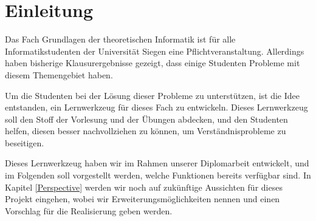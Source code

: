 



\chapter{Einleitung}\label{Introduction}

Das Fach Grundlagen der theoretischen Informatik ist für alle
Informatikstudenten der Universität Siegen eine Pflichtveranstaltung. Allerdings
haben bisherige Klausurergebnisse gezeigt, dass einige Studenten Probleme mit
diesem Themengebiet haben.\vspace{10pt}

Um die Studenten bei der Lösung dieser Probleme zu unterstützen, ist die Idee
entstanden, ein Lernwerkzeug für dieses Fach zu entwickeln. Dieses Lernwerkzeug
soll den Stoff der Vorlesung und der Übungen abdecken, und den Studenten helfen,
diesen besser nachvollziehen zu können, um Verständnisprobleme zu
beseitigen.\vspace{10pt}

Dieses Lernwerkzeug haben wir im Rahmen unserer Diplomarbeit entwickelt, und im
Folgenden soll vorgestellt werden, welche Funktionen bereits verfügbar sind. In
Kapitel \ref{Perspective} werden wir noch auf zukünftige Aussichten für dieses
Projekt eingehen, wobei wir Erweiterungsmöglichkeiten nennen und einen Vorschlag
für die Realisierung geben werden.\vspace{10pt}


